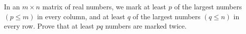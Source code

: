 In an $m \times n$ matrix of real numbers, we mark at least $p$ of the largest numbers $(p \leq m)$ in every column, and at least $q$ of the largest numbers $(q \leq n)$ in every row. Prove that at least $pq$ numbers are marked twice.
